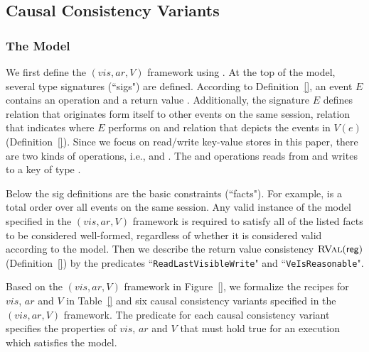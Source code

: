 
\subsection{Causal Consistency Variants} \label{ss:cc-variants}

\subsubsection{The \alloystar{} Model} \label{sss:cc-alloystar}

We first define the $(vis,ar,V)$ framework using \alloy.
At the top of the model, several type signatures (``sigs") are defined.
According to Definition~\ref{}, an event $E$ contains
an operation \op{} and a return value \rval.
Additionally, the signature $E$ defines \so relation that
originates form itself to other events on the same session,
\session{} relation that indicates where $E$ performs on
and \ve{} relation that depicts the events in $V(e)$ (Definition~\ref{}).
Since we focus on read/write key-value stores in this paper,
there are two kinds of operations, i.e., \Read{} and \Write.
The \Read{} and \Write{} operations reads from
and writes to a key of type \Key.

Below the sig definitions are the basic constraints (``facts").
For example, \so{} is a total order over all events on the same session.
Any valid instance of the model specified in the $(vis,ar,V)$ framework
is required to satisfy all of the listed facts to be considered well-formed,
regardless of whether it is considered valid according to the model.
Then we describe the return value consistency $\textsc{RVal}(\textsf{reg})$ (Definition~\ref{})
by the predicates ``\texttt{ReadLastVisibleWrite}" and ``\texttt{VeIsReasonable}".

Based on the $(vis,ar,V)$ framework in Figure~\ref{},
we formalize the recipes for $vis$, $ar$ and $V$ in Table~\ref{} and
six causal consistency variants specified in the $(vis,ar,V)$ framework.
The predicate for each causal consistency variant specifies
the properties of $vis$, $ar$ and $V$ that must hold true for
an execution which satisfies the model.

\subsubsection{\taskchecking} \label{sss:cc-taskchecking}

\subsubsection{\taskgenerating} \label{sss:cc-taskgenerating}

\subsubsection{\taskcomparing} \label{sss:cc-taskcomparing}

